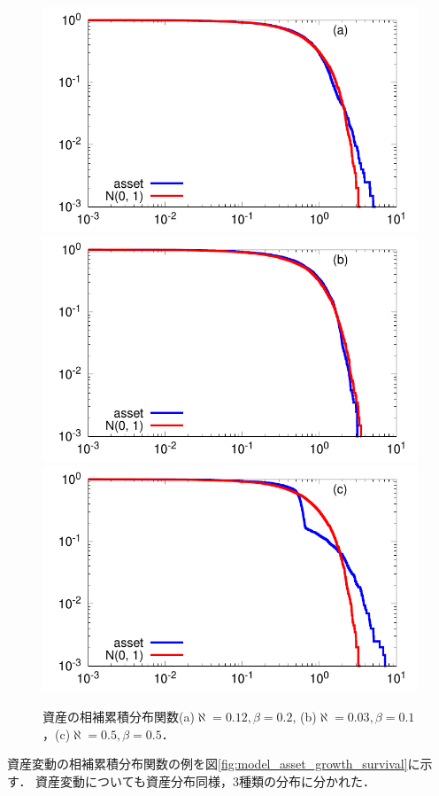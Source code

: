 \documentclass[titlepage]{jsreport}
\begin{document}
\begin{figure}[htbp]
    \centering
    \includegraphics[width=0.7\linewidth]{fig/asset_a012_b02.pdf}
    \includegraphics[width=0.7\linewidth]{fig/asset_a003_b01.pdf}
    \includegraphics[width=0.7\linewidth]{fig/asset_a05_b05.pdf}
    \caption{資産の相補累積分布関数(a)$\aleph = 0.12, \beta = 0.2$, (b)$\aleph = 0.03, \beta = 0.1$，(c)$\aleph = 0.5, \beta = 0.5$．}
    \label{fig:model_asset_survival}
\end{figure}

資産変動の相補累積分布関数の例を図\ref{fig:model_asset_growth_survival}に示す．
資産変動についても資産分布同様，3種類の分布に分かれた．
\end{document}

